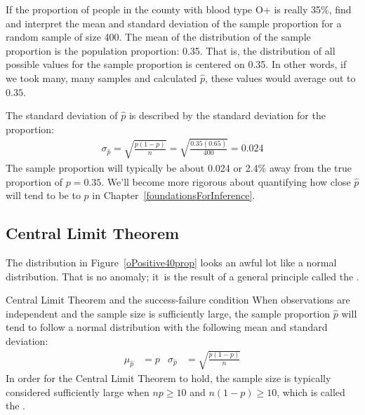 \begin{examplewrap}
\begin{nexample}{If the proportion of people in the county with blood type O+ is really 35\%, find and interpret the mean and standard deviation of the sample proportion for a random sample of size 400.}
The mean of the distribution of the sample proportion is the population proportion: 0.35. That is, the distribution of all possible values for the sample proportion is centered on 0.35.  In other words, if we took many, many samples and calculated $\hat{p}$, these values would average out to $0.35$.  

The standard deviation of $\hat{p}$ is described by the standard deviation for the proportion:
\begin{align*}
\sigma_{\hat{p}}
	= \sqrt{\frac{p(1-p)}{n}}
	= \sqrt{\frac{0.35(0.65)}{400}}
	= 0.024
\end{align*}
The sample proportion will typically be about 0.024 or 2.4\% away from the true proportion of $p = 0.35$. We'll become more rigorous about quantifying how close $\hat{p}$ will tend to be to $p$ in Chapter~\ref{foundationsForInference}.
\end{nexample}
\end{examplewrap}


\D{\newpage}

\subsection{Central Limit Theorem}

The distribution in
Figure~\ref{oPositive40prop} looks an awful lot like
a normal distribution. That is no anomaly; it~is the result
of a general principle called the
.

\begin{onebox}{Central Limit Theorem and the success-failure condition}
  When observations are independent and the sample size is
  sufficiently large, the sample proportion $\hat{p}$ will tend
  to follow a normal distribution with the following mean and
  standard deviation:%
  \begin{align*}
    \mu_{\hat{p}} &= p
    &\sigma_{\hat{p}} &= \sqrt{\frac{p (1 - p)}{n}}
  \end{align*}
  In order for the Central Limit Theorem to hold,
  the sample size is typically considered sufficiently large
  when $np \geq 10$ and $n(1-p) \geq 10$, which is called the
  .
\end{onebox}


